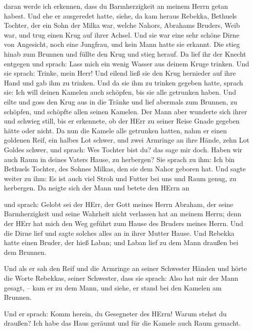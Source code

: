 daran werde ich erkennen, dass du Barmherzigkeit an meinem Herrn getan
habest.  Und ehe er ausgeredet hatte, siehe, da kam heraus
Rebekka, Bethuels Tochter, der ein Sohn der Milka war, welche Nahors,
Abrahams Bruders, Weib war, und trug einen Krug auf ihrer Achsel.
 Und sie war eine sehr schöne Dirne von Angesicht, noch
eine Jungfrau, und kein Mann hatte sie erkannt. Die stieg hinab zum
Brunnen und füllte den Krug und stieg herauf.  Da lief ihr
der Knecht entgegen und sprach: Lass mich ein wenig Wasser aus deinem
Kruge trinken.  Und sie sprach: Trinke, mein Herr! Und
eilend ließ sie den Krug hernieder auf ihre Hand und gab ihm zu trinken.
 Und da sie ihm zu trinken gegeben hatte, sprach sie: Ich
will deinen Kamelen auch schöpfen, bis sie alle getrunken haben.
 Und eilte und goss den Krug aus in die Tränke und lief
abermals zum Brunnen, zu schöpfen, und schöpfte allen seinen Kamelen.
 Der Mann aber wunderte sich ihrer und schwieg still, bis
er erkennete, ob der HErr zu seiner Reise Gnade gegeben hätte oder
nicht.  Da nun die Kamele alle getrunken hatten, nahm er
einen goldenen Reif, ein halbes Lot schwer, und zwei Armringe an ihre
Hände, zehn Lot Goldes schwer,  und sprach: Wes Tochter
bist du? das sage mir doch. Haben wir auch Raum in deines Vaters Hause,
zu herbergen?  Sie sprach zu ihm: Ich bin Bethuels Tochter,
des Sohnes Milkas, den sie dem Nahor geboren hat.  Und
sagte weiter zu ihm: Es ist auch viel Stroh und Futter bei uns und Raum
genug, zu herbergen.  Da neigte sich der Mann und betete
den HErrn an

 und sprach: Gelobt sei der HErr, der Gott meines Herrn
Abraham, der seine Barmherzigkeit und seine Wahrheit nicht verlassen hat
an meinem Herrn; denn der HErr hat mich den Weg geführt zum Hause des
Bruders meines Herrn.  Und die Dirne lief und sagte solches
alles an in ihrer Mutter Hause.  Und Rebekka hatte einen
Bruder, der hieß Laban; und Laban lief zu dem Mann draußen bei dem
Brunnen.

 Und als er sah den Reif und die Armringe an seiner
Schwester Händen und hörte die Worte Rebekkas, seiner Schwester, dass
sie sprach: Also hat mir der Mann gesagt, -- kam er zu dem Mann, und
siehe, er stand bei den Kamelen am Brunnen.

 Und er sprach: Komm herein, du Gesegneter des HErrn! Warum
stehst du draußen? Ich habe das Haus geräumt und für die Kamele auch
Raum gemacht.

